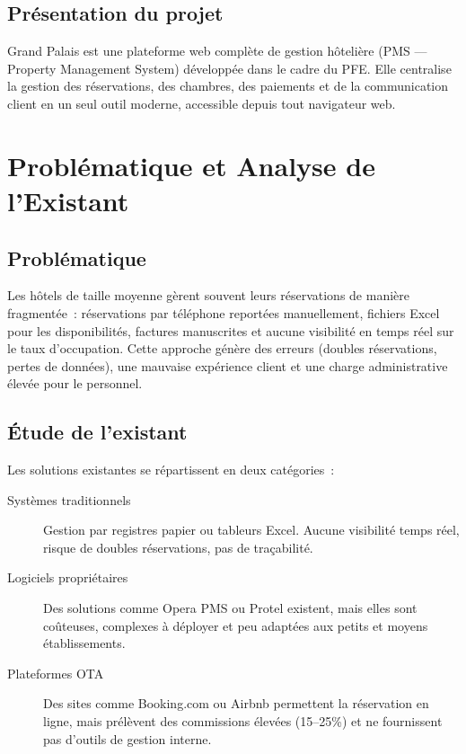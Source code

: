 \documentclass[12pt, a4paper]{report}
\begin{document}
\subsection{Présentation du projet}

Grand Palais est une plateforme web complète de gestion hôtelière (PMS — Property
Management System) développée dans le cadre du PFE. Elle centralise la gestion des
réservations, des chambres, des paiements et de la communication client en un seul
outil moderne, accessible depuis tout navigateur web.

\section{Problématique et Analyse de l'Existant}

\subsection{Problématique}

Les hôtels de taille moyenne gèrent souvent leurs réservations de manière fragmentée~:
réservations par téléphone reportées manuellement, fichiers Excel pour les disponibilités,
factures manuscrites et aucune visibilité en temps réel sur le taux d'occupation.
Cette approche génère des erreurs (doubles réservations, pertes de données), une
mauvaise expérience client et une charge administrative élevée pour le personnel.

\subsection{Étude de l'existant}

Les solutions existantes se répartissent en deux catégories~:

\begin{description}
  \item[Systèmes traditionnels] Gestion par registres papier ou tableurs Excel.
    Aucune visibilité temps réel, risque de doubles réservations, pas de traçabilité.
  \item[Logiciels propriétaires] Des solutions comme Opera PMS ou Protel existent,
    mais elles sont coûteuses, complexes à déployer et peu adaptées aux petits
    et moyens établissements.
  \item[Plateformes OTA] Des sites comme Booking.com ou Airbnb permettent la réservation
    en ligne, mais prélèvent des commissions élevées (15--25\%) et ne fournissent
    pas d'outils de gestion interne.
\end{description}
\end{document}
